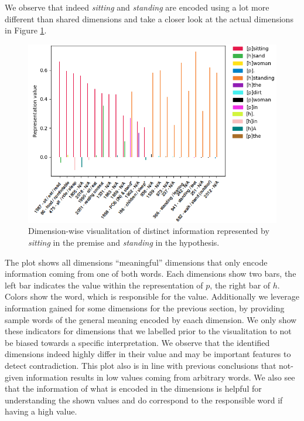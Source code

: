 We observe that indeed \textit{sitting} and \textit{standing} are encoded using  a lot more different than shared dimensions and take a closer look at the actual dimensions in Figure \ref{fig:contradiction_alignment_unshared_dimwise}. 
\begin{figure}[tph!]
\centering
	\includegraphics[totalheight=7cm]{fig/contradiction_alignment_unshared_dimwise.png}
	\caption{Dimension-wise visualitation of distinct information represented by \textit{sitting} in the premise and \textit{standing} in the hypothesis.}
	\label{fig:contradiction_alignment_unshared_dimwise}
\end{figure}
The plot shows all dimensions ``meaningful'' dimensions that only encode information coming from one of both words. Each dimensions show two bars, the left bar indicates the value within the representation of $p$, the right bar of $h$. Colors show the word, which is responsible for the value. Additionally we leverage information gained for some dimensions for the previous section, by providing sample words of the general meaning encoded by eaach dimension. We only show these indicators for dimensions that we labelled prior to the visualitation to not be biased towards a specific interpretation. We observe that the identified dimensions indeed highly differ in their value and may be important features to detect contradiction. This plot also is in line with previous conclusions that not-given information results in low values coming from arbitrary words. We also see that the information of what is encoded in the dimensions is helpful for understanding the shown values and do correspond to the responsible word if having a high value.
